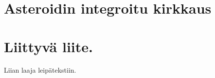 \documentclass[12pt,a4paper,titlepage]{article}
\begin{document}
\section{Asteroidin integroitu kirkkaus}





\appendix
\newpage
\section{Liittyvä liite.} \label{koodi}
Liian laaja leipätekstiin.
\end{document}
